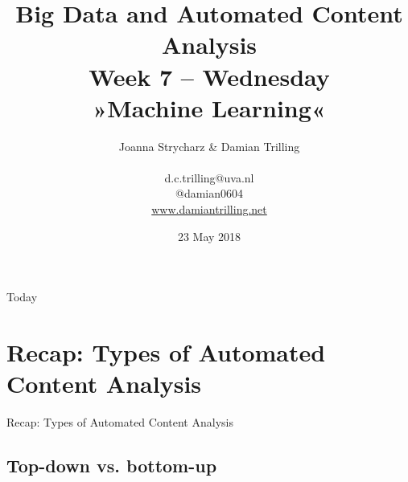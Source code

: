 \documentclass{beamer}
\begin{document}
\title[Big Data and Automated Content Analysis]{\textbf{Big Data and Automated Content Analysis} \\ Week 7 -- Wednesday \\ »Machine Learning«}
\author[Damian Trilling]{Joanna Strycharz \& Damian Trilling \\ ~ \\ \footnotesize{d.c.trilling@uva.nl \\@damian0604} \\ \url{www.damiantrilling.net}}
\date{23 May 2018}


\begin{frame}{}
\titlepage
\end{frame}

\begin{frame}{Today}
\tableofcontents
\end{frame}




\section[Recap]{Recap: Types of Automated Content Analysis}
\begin{frame}{}
Recap: Types of Automated Content Analysis
\end{frame}
\subsection*{Top-down vs. bottom-up}


\begin{frame}[plain]
\end{frame}
\end{document}

